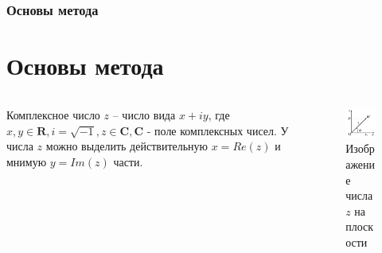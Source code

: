 \documentclass{beamer}
\newcommand\frametitleSpec[1]{%
\frametitle{#1}
\section{#1}%
}
\begin{document}
\begin{frame}
   \frametitleSpec{Основы метода}
   \begin{columns}
      \begin{column}{0.5\textwidth}
         Комплексное число \(z\) -- число вида $x + iy$, где $x,y \in \mathbf{R}, i = \sqrt{-1},z \in \mathbf{C}, \mathbf{C}$ - поле комплексных чисел. У числа \(z\) можно выделить действительную $x = Re(z)$ и мнимую $y=Im(z)$ части.
      \end{column}
      \begin{column}{0.5\textwidth}
         \begin{figure}
            \centering
            \includegraphics[width=1\textwidth]{images/theory-1.pdf}
            \caption{Изображение числа \(z\) на плоскости}
            \label{img1}
         \end{figure}
      \end{column}
   \end{columns}
\end{frame}
\end{document}
